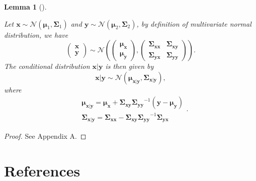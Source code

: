 \documentclass[
  a4paper,
  oneside,
  openany,
  12pt,
  onecolumn,
  twoside]{book}
\theoremstyle{plain}
\newtheorem{lemma}{Lemma}[chapter]
\theoremstyle{remark}
\begin{document}
\begin{lemma}[]\protect\hypertarget{lem-con-distribution}{}\label{lem-con-distribution}

Let
\(\boldsymbol{x}\sim \mathcal{N}(\boldsymbol{\mu}_1,\boldsymbol{\Sigma}_1)\)
and
\(\boldsymbol{y}\sim \mathcal{N}(\boldsymbol{\mu}_2,\boldsymbol{\Sigma}_2)\),
by definition of multivariate normal distribution, we have \[
\begin{pmatrix}
\boldsymbol{x}\\
\boldsymbol{y}
\end{pmatrix}
\sim \mathcal{N}(
\begin{pmatrix}
\boldsymbol{\mu_x}\\
\boldsymbol{\mu_y}
\end{pmatrix}
,
\begin{pmatrix}
\boldsymbol{\Sigma_{xx}} & \boldsymbol{\Sigma_{xy}}\\
\boldsymbol{\Sigma_{yx}} & \boldsymbol{\Sigma_{yy}}
\end{pmatrix}
).
\] The conditional distribution \(\boldsymbol{x}|\boldsymbol{y}\) is
then given by \[
\boldsymbol{x}|\boldsymbol{y} \sim \mathcal{N}(\boldsymbol{\mu_{x|y}},\boldsymbol{\Sigma_{x|y}}),
\] where \[
\begin{align*}
& \boldsymbol{\mu_{x|y}} = \boldsymbol{\mu_x}+\boldsymbol{\Sigma_{xy}}\boldsymbol{\Sigma_{yy}}^{-1}(\boldsymbol{y}-\boldsymbol{\mu_y})\\
& \boldsymbol{\Sigma_{x|y}} = \boldsymbol{\Sigma_{xx}}-\boldsymbol{\Sigma_{xy}}\boldsymbol{\Sigma_{yy}}^{-1}\boldsymbol{\Sigma_{yx}}
\end{align*}.
\]

\end{lemma}

\begin{proof}
See Appendix A.
\end{proof}


\chapter*{References}\label{references}


\renewcommand{\bibsection}{}



\backmatter
\end{document}
